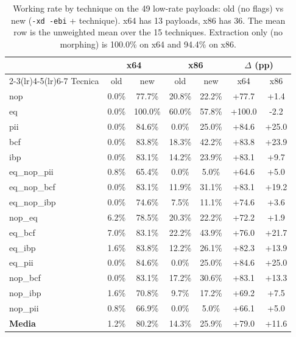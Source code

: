 \documentclass[11pt]{article}
\begin{document}
\begin{table}[htbp]
\centering
\caption{Working rate by technique on the 49 low-rate payloads: old (no flags)
vs new (\texttt{-xd -ebi} + technique). x64 has 13 payloads, x86 has 36.
The mean row is the unweighted mean over the 15 techniques.
Extraction only (no morphing) is 100.0\% on x64 and 94.4\% on x86.}
\label{tab:working_rate_updated}
\begin{tabular}{lcccccc}
\toprule
 & \multicolumn{2}{c}{x64} & \multicolumn{2}{c}{x86} & \multicolumn{2}{c}{$\Delta$ (pp)} \\
\cmidrule(lr){2-3}\cmidrule(lr){4-5}\cmidrule(lr){6-7}
Tecnica & old & new & old & new & x64 & x86 \\
\midrule
nop & 0.0\% & 77.7\% & 20.8\% & 22.2\% & +77.7 & +1.4 \\
eq & 0.0\% & 100.0\% & 60.0\% & 57.8\% & +100.0 & -2.2 \\
pii & 0.0\% & 84.6\% & 0.0\% & 25.0\% & +84.6 & +25.0 \\
bcf & 0.0\% & 83.8\% & 18.3\% & 42.2\% & +83.8 & +23.9 \\
ibp & 0.0\% & 83.1\% & 14.2\% & 23.9\% & +83.1 & +9.7 \\
eq\_nop\_pii & 0.8\% & 65.4\% & 0.0\% & 5.0\% & +64.6 & +5.0 \\
eq\_nop\_bcf & 0.0\% & 83.1\% & 11.9\% & 31.1\% & +83.1 & +19.2 \\
eq\_nop\_ibp & 0.0\% & 74.6\% & 7.5\% & 11.1\% & +74.6 & +3.6 \\
nop\_eq & 6.2\% & 78.5\% & 20.3\% & 22.2\% & +72.2 & +1.9 \\
eq\_bcf & 7.0\% & 83.1\% & 22.2\% & 43.9\% & +76.0 & +21.7 \\
eq\_ibp & 1.6\% & 83.8\% & 12.2\% & 26.1\% & +82.3 & +13.9 \\
eq\_pii & 0.0\% & 84.6\% & 0.0\% & 25.0\% & +84.6 & +25.0 \\
nop\_bcf & 0.0\% & 83.1\% & 17.2\% & 30.6\% & +83.1 & +13.3 \\
nop\_ibp & 1.6\% & 70.8\% & 9.7\% & 17.2\% & +69.2 & +7.5 \\
nop\_pii & 0.8\% & 66.9\% & 0.0\% & 5.0\% & +66.1 & +5.0 \\
\midrule
\textbf{Media} & 1.2\% & 80.2\% & 14.3\% & 25.9\% & +79.0 & +11.6 \\
\bottomrule
\end{tabular}
\end{table}
\end{document}
